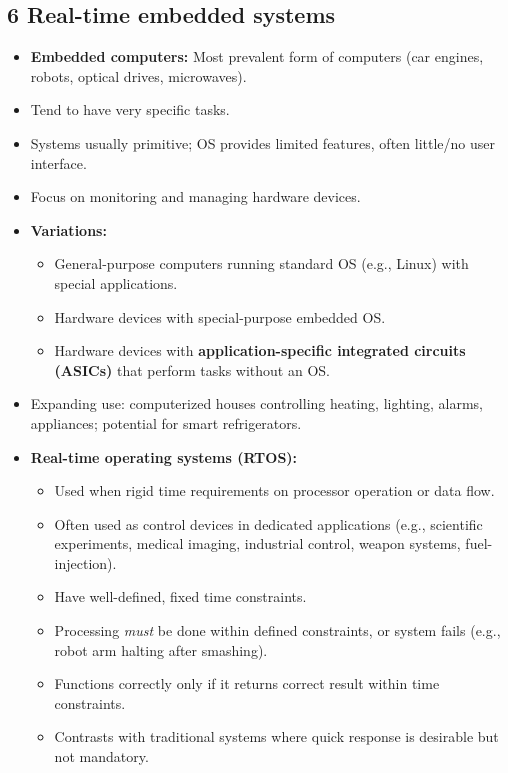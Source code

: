 \documentclass{article}
\begin{document}
\subsection*{6 Real-time embedded systems}
\begin{itemize}
    \item \textbf{Embedded computers:} Most prevalent form of computers (car engines, robots, optical drives, microwaves).
    \item Tend to have very specific tasks.
    \item Systems usually primitive; OS provides limited features, often little/no user interface.
    \item Focus on monitoring and managing hardware devices.
    \item \textbf{Variations:}
    \begin{itemize}
        \item General-purpose computers running standard OS (e.g., Linux) with special applications.
        \item Hardware devices with special-purpose embedded OS.
        \item Hardware devices with \textbf{application-specific integrated circuits (ASICs)} that perform tasks without an OS.
    \end{itemize}
    \item Expanding use: computerized houses controlling heating, lighting, alarms, appliances; potential for smart refrigerators.
    \item \textbf{Real-time operating systems (RTOS):}
    \begin{itemize}
        \item Used when rigid time requirements on processor operation or data flow.
        \item Often used as control devices in dedicated applications (e.g., scientific experiments, medical imaging, industrial control, weapon systems, fuel-injection).
        \item Have well-defined, fixed time constraints.
        \item Processing \textit{must} be done within defined constraints, or system fails (e.g., robot arm halting after smashing).
        \item Functions correctly only if it returns correct result within time constraints.
        \item Contrasts with traditional systems where quick response is desirable but not mandatory.
    \end{itemize}
\end{itemize}
\end{document}
